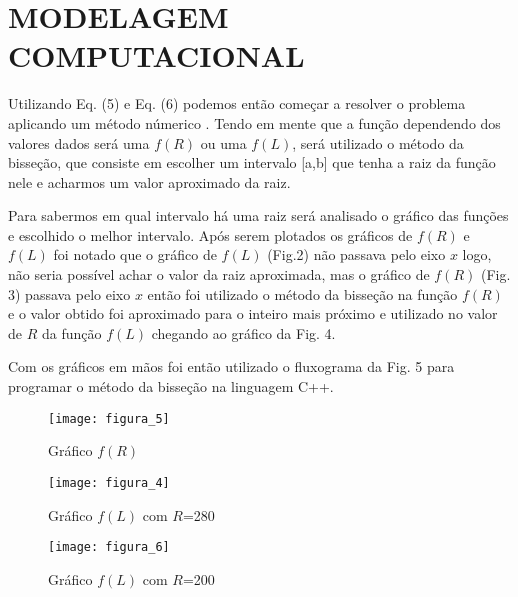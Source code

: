 \documentclass[12pt,fleqn]{article}
\begin{document}
\section{MODELAGEM COMPUTACIONAL}
Utilizando Eq. (5) e Eq. (6) podemos então começar a resolver o problema aplicando um método númerico \cite{chapra2008metodos}.
Tendo em mente que a função dependendo dos valores dados será uma $f(R)$ ou uma $f(L)$, será utilizado o método da bisseção, que consiste em escolher um intervalo [a,b] que tenha a raiz da função nele e acharmos um valor aproximado da raiz. 

Para sabermos em qual intervalo há uma raiz será analisado o gráfico das funções e escolhido o melhor intervalo. Após serem plotados os gráficos de $f(R)$ e $f(L)$ foi notado que o gráfico de $f(L)$ (Fig.2) não passava pelo eixo $x$ logo, não seria possível achar o valor da raiz aproximada, mas o gráfico de $f(R)$ (Fig. 3) passava pelo eixo $x$ então foi utilizado o método da bisseção na função $f(R)$ e o valor obtido foi aproximado para o inteiro mais próximo e utilizado no valor de $R$ da função $f(L)$ chegando ao gráfico da Fig. 4.

Com os gráficos em mãos foi então utilizado o fluxograma da Fig. 5 para programar o método da bisseção na linguagem C++.

\begin{figure}[H] %
\vspace{-2pt}
\begin{center}
\texttt{[image: figura\_5]}%
\caption{Gráfico $f(R)$}
\label{fig4}%
\end{center}
\end{figure}

\begin{figure}[H] %
\vspace{-2pt}
\begin{center}
\texttt{[image: figura\_4]}%
\caption{Gráfico $f(L)$ com $R$=280}
\label{fig5}%
\end{center}
\end{figure}

\begin{figure}[H] %
\vspace{-2pt}
\begin{center}
\texttt{[image: figura\_6]}%
\caption{Gráfico $f(L)$ com $R$=200}
\label{fig6}%
\end{center}
\end{figure}
\end{document}
